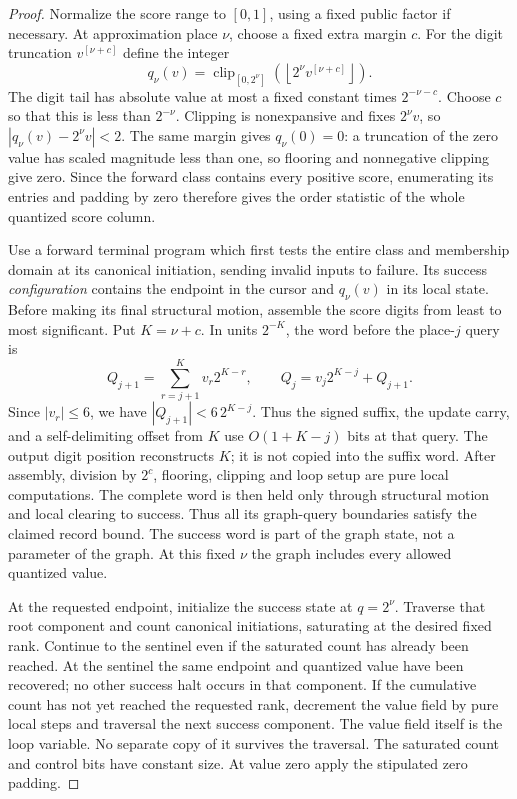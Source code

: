 \begin{proof}
Normalize the score range to $[0,1]$, using a fixed public factor if
necessary.  At approximation place $\nu$, choose a fixed extra margin $c$.
For the digit truncation $v^{[\nu+c]}$ define the integer
\begin{equation}\label{eq:ctrl-score-quantization}
 q_\nu(v)=\operatorname{clip}_{[0,2^\nu]}
             \left(\left\lfloor 2^\nu v^{[\nu+c]}\right\rfloor\right).
\end{equation}
The digit tail has absolute value at most a fixed constant times
$2^{-\nu-c}$.  Choose $c$ so that this is less than $2^{-\nu}$.
Clipping is nonexpansive and fixes $2^\nu v$, so
$|q_\nu(v)-2^\nu v|<2$.  The same margin gives $q_\nu(0)=0$:
a truncation of the zero value has scaled magnitude less than one, so
flooring and nonnegative clipping give zero.  Since the forward class
contains every positive score, enumerating its entries and padding by
zero therefore gives the order statistic of the whole quantized score column.

Use a forward terminal program which first tests the entire class and
membership domain at its canonical initiation, sending invalid inputs
to failure.  Its success \emph{configuration} contains the endpoint in
the cursor and $q_\nu(v)$ in its local state.  Before making its final
structural motion, assemble the score digits from least to most
significant.  Put $K=\nu+c$. In units $2^{-K}$, the word before the
place-$j$ query is
\[
 Q_{j+1}=\sum_{r=j+1}^{K}v_r2^{K-r},\qquad
 Q_j=v_j2^{K-j}+Q_{j+1}.
\]
Since $|v_r|\le6$, we have
$|Q_{j+1}|<6\,2^{K-j}$. Thus the signed suffix, the update carry,
and a self-delimiting offset from $K$ use $O(1+K-j)$ bits
at that query. The output digit position reconstructs $K$; it is not
copied into the suffix word.  After assembly,
division by $2^c$, flooring, clipping and loop setup are pure local computations.  The
complete word is then held only through structural motion and local
clearing to success.  Thus all its graph-query boundaries satisfy the
claimed record bound.  The success word is part of the graph state, not
a parameter of the graph.  At this fixed $\nu$ the graph includes every
allowed quantized value.

At the requested endpoint, initialize the success state at $q=2^\nu$.
Traverse that root component and count canonical
initiations, saturating at the desired fixed rank.  Continue to the
sentinel even if the saturated count has already been reached.  At the
sentinel the same endpoint and quantized value have been recovered; no
other success halt occurs in that component.  If the cumulative count
has not yet reached the requested rank, decrement the value field by
pure local steps and traversal the next success component.  The value field
itself is the loop variable.  No separate copy of it survives the traversal.
The saturated count and control bits have constant size.  At value zero
apply the stipulated zero padding.


\end{proof}
